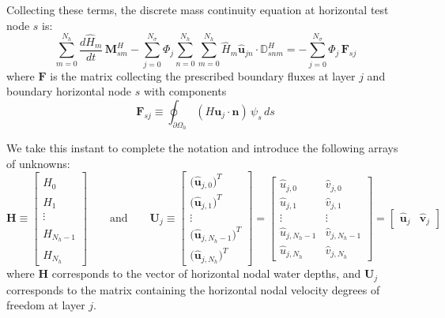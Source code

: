 \documentclass{article}
\newcommand{\Ns}{N_\sigma}
\newcommand{\uj}{\mathbf{u}_j}
\newcommand{\sumj}{\sum_{j=0}^{\Ns}}
\newcommand{\Nh}{N_h}
\newcommand{\sumNhn}{\sum_{n=0}^{\Nh}}
\newcommand{\sumNhm}{\sum_{m=0}^{\Nh}}
\newcommand{\uhjn}{\hat{\mathbf{u}}_{jn}}
\newcommand{\Hm}{\hat{H}_m}
\newcommand{\HMsm}{\mathbf{M}_{sm}^H}
\newcommand{\HDsnma}{\mathbb{D}_{snm}^H}
\begin{document}
Collecting these terms, the discrete mass continuity equation at horizontal test node $s$ is:
\begin{equation}
\boxed{\sumNhm \frac{d\Hm}{dt}\,\HMsm - \sumj\Phi_j \sumNhn\sumNhm \Hm\uhjn \cdot \HDsnma = -\sumj\Phi_j\,\mathbf{F}_{sj}}
    \label{eq: fully discrete mass continuity}
\end{equation}
where $\mathbf{F}$ is the matrix collecting the prescribed boundary fluxes at layer $j$ and boundary horizontal node $s$ with components
\begin{equation}
    \mathbf{F}_{sj} \equiv \oint_{\partial\Omega_h}(H\uj\cdot\mathbf{n})\,\psi_s\,ds  
    \label{eq: horizontal mass continuity boudary fluxes}
\end{equation}

We take this instant to complete the notation and introduce the following arrays of unknowns:
\begin{equation}
    \mathbf{H} \equiv \begin{bmatrix} 
    \hat{H}_0 \\[1mm]
    \hat{H}_1 \\[1mm] 
    \vdots \\[1mm]
    \hat{H}_{\Nh -1}\\[1mm]
    \hat{H}_{\Nh}
    \end{bmatrix} \qquad \text{and} \qquad  
    \mathbf{U}_j \equiv \begin{bmatrix} 
    \big(\hat{\mathbf{u}}_{j,0}\big)^T \\[1mm]
    \big(\hat{\mathbf{u}}_{j,1}\big)^T \\[1mm]
    \vdots \\[1mm]
    \big(\hat{\mathbf{u}}_{j,\Nh -1}\big)^T\\[1mm]
    \big(\hat{\mathbf{u}}_{j,\Nh}\big)^T
    \end{bmatrix} = \begin{bmatrix}
    \hat{u}_{j,0} & \hat{v}_{j,0} \\[1.5mm]
    \hat{u}_{j,1} & \hat{v}_{j,1} \\[1.5mm]
    \vdots & \vdots \\[1.5mm]
    \hat{u}_{j,\Nh -1} & \hat{v}_{j,\Nh -1} \\[1.5mm]
    \hat{u}_{j,\Nh} & \hat{v}_{j,\Nh} 
    \end{bmatrix} = \begin{bmatrix}
        \hat{\mathbf{u}}_j & \hat{\mathbf{v}}_j
    \end{bmatrix}
    \label{eq: def array of horizontal unknowns}
\end{equation}
where $\mathbf{H}$ corresponds to the vector of horizontal nodal water depths, and $\mathbf{U}_j$ corresponds to the matrix containing the horizontal nodal velocity degrees of freedom at layer $j$.
\end{document}
